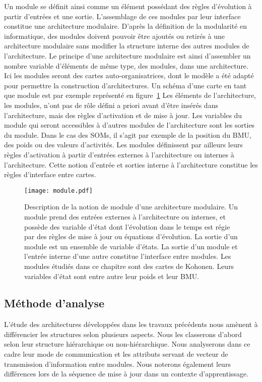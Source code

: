\documentclass[../main]{subfiles}
\begin{document}
Un module se définit ainsi comme un élément possédant des règles d'évolution à partir d'entrées et une sortie. L'assemblage de ces modules par leur interface constitue une architecture modulaire. D'après la définition de la modularité en informatique, des modules doivent pouvoir être ajoutés ou retirés à une architecture modulaire sans modifier la structure interne des autres modules de l'architecture.
Le principe d'une architecture modulaire est ainsi d'assembler un nombre variable d'éléments de même type, des modules, dans une architecture. Ici les modules seront des cartes auto-organisatrices, dont le modèle a été adapté pour permettre la construction d'architectures. Un schéma d'une carte en tant que module est par exemple représenté en figure~\ref{fig:module}
Les éléments de l'architecture, les modules, n'ont pas de rôle défini a priori avant d'être insérés dans l'architecture, mais des règles d'activation et de mise à jour.
Les variables du module qui seront accessibles à d'autres modules de l'architecture sont les sorties du module. Dans le cas des SOMs, il s'agit par exemple de la position du BMU, des poids ou des valeurs d'activités.
Les modules définissent par ailleurs leurs règles d'activation à partir d'entrées externes à l'architecture ou internes à l'architecture.
Cette notion d'entrée et sorties interne à l'architecture constitue les règles d'interface entre cartes.



\begin{figure}
    \centering
    \texttt{[image: module.pdf]}
    \caption{Description de la notion de module d'une architecture modulaire. Un module prend des entrées externes à l'architecture ou internes, et possède des variable d'état dont l'évolution dans le temps est régie par des règles de mise à jour ou équations d'évolution. La sortie d'un module est un ensemble de variable d'états. La sortie d'un module et l'entrée interne d'une autre constitue l'interface entre modules. Les modules étudiés dans ce chapitre sont des cartes de Kohonen. Leurs variables d'état sont entre autre leur poids et leur BMU.\label{fig:module} }
\end{figure}

\subsection{Méthode d'analyse}

L'étude des architectures développées dans les travaux précédents nous amènent à différencier les structures selon plusieurs aspects. Nous les classerons d'abord selon leur structure hiérarchique ou non-hiérarchique.
Nous analyserons dans ce cadre leur mode de communication et les attributs servant de vecteur de transmission d'information entre modules. Nous noterons également leurs différences lors de la séquence de mise à jour dans un contexte d'apprentissage.
\end{document}
